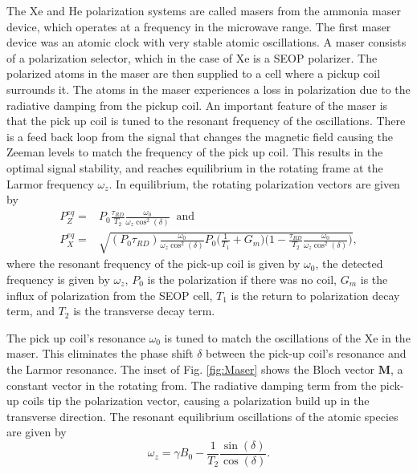 The Xe and He polarization systems are called masers from the ammonia maser device, which operates at a frequency in the microwave range. The first maser device was an atomic clock with very stable atomic oscillations. A maser consists of a polarization selector, which in the case of Xe is a SEOP polarizer. The polarized atoms in the maser are then supplied to a cell where a pickup coil surrounds it. The atoms in the maser experiences a loss in polarization due to the radiative damping from the pickup coil. An important feature of the maser is that the pick up coil is tuned to the resonant frequency of the oscillations. There is a feed back loop from the signal that changes the magnetic field causing the Zeeman levels to match the frequency of the pick up coil.  This results in the optimal signal stability, and reaches equilibrium in the rotating frame at the Larmor frequency $\omega_z$.  In equilibrium, the rotating polarization vectors are given by
\begin{equation}
    \begin{split}
        P^{eq}_Z  =& P_0 \frac{\tau_{RD}}{T_2} \frac{\omega_0}{\omega_z \cos^2{(\delta)}} \; \; \textrm{and}\\        
        P^{eq}_X =& \sqrt{(P_0 \tau_{RD}) \frac{\omega_0}{\omega_z \cos^2{(\delta)} }P_0 \bigg( \frac{1}{T_1}+G_m\bigg) \bigg(1-\frac{\tau_{RD}}{T_2} \frac{\omega_0}{\omega_z \cos^2{(\delta)} } \bigg)},
    \end{split}
\end{equation}
where the resonant frequency of the pick-up coil is given by $\omega_0$, the detected frequency is given by $\omega_z$, $P_0$ is the polarization if there was no coil, $G_m$ is the influx of polarization from the SEOP cell, $T_1$ is the return to polarization decay term, and $T_2$ is the transverse decay term.   

The pick up coil's resonance $\omega_0$ is tuned to match the oscillations of the Xe in the maser. This eliminates the phase shift $\delta$ between the pick-up coil's resonance and the Larmor resonance. The inset of Fig. \ref{fig:Maser} shows the Bloch vector $\textbf{M}$, a constant vector in the rotating from. The radiative damping term from the pick-up coils tip the polarization vector, causing a polarization build up in the transverse direction. The resonant equilibrium oscillations of the atomic species are given by
\begin{equation}
    \omega_z = \gamma B_0 - \frac{1}{T_2} \frac{\sin(\delta)}{\cos{(\delta)}}.\label{eq:maserOmega}
\end{equation}

